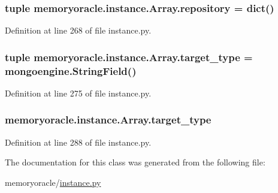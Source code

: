 \subsubsection[{repository}]{\setlength{\rightskip}{0pt plus 5cm}tuple memoryoracle.\+instance.\+Array.\+repository = dict()\hspace{0.3cm}{\ttfamily [static]}}\label{classmemoryoracle_1_1instance_1_1Array_ae8a854bbb76db4aa9661677964d99846}


Definition at line 268 of file instance.\+py.

\hypertarget{classmemoryoracle_1_1instance_1_1Array_a23836ff62d41326159a9a47ad3813e38}{}
\subsubsection[{target\+\_\+type}]{\setlength{\rightskip}{0pt plus 5cm}tuple memoryoracle.\+instance.\+Array.\+target\+\_\+type = mongoengine.\+String\+Field()\hspace{0.3cm}{\ttfamily [static]}}\label{classmemoryoracle_1_1instance_1_1Array_a23836ff62d41326159a9a47ad3813e38}


Definition at line 275 of file instance.\+py.

\hypertarget{classmemoryoracle_1_1instance_1_1Array_aa69695506b2de9ec3336d03efb4fea09}{}
\subsubsection[{target\+\_\+type}]{\setlength{\rightskip}{0pt plus 5cm}memoryoracle.\+instance.\+Array.\+target\+\_\+type}\label{classmemoryoracle_1_1instance_1_1Array_aa69695506b2de9ec3336d03efb4fea09}


Definition at line 288 of file instance.\+py.



The documentation for this class was generated from the following file\+:\begin{DoxyCompactItemize}
\item 
memoryoracle/\hyperlink{instance_8py}{instance.\+py}\end{DoxyCompactItemize}
